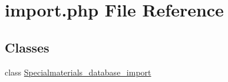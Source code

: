 \hypertarget{import_8php}{\section{import.\+php File Reference}
\label{import_8php}
}
\subsection*{Classes}
\begin{DoxyCompactItemize}
\item 
class \hyperlink{classSpecialmaterials__database__import}{Specialmaterials\+\_\+database\+\_\+import}
\end{DoxyCompactItemize}
